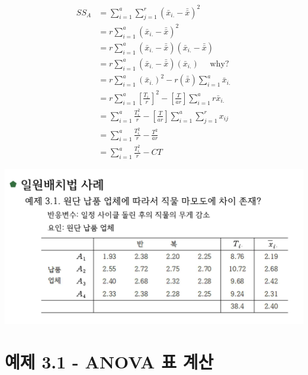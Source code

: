 \documentclass[
]{book}
\begin{document}
\begin{align*}
SS_A & = \sum_{i=1}^a \sum_{j=1}^r (\bar {x}_{i.} - \bar{\bar {x}} )^2 \\
   & = r \sum_{i=1}^a (\bar {x}_{i.} - \bar{\bar {x}} )^2 \\
   & = r \sum_{i=1}^a (\bar {x}_{i.} - \bar{\bar {x}} ) (\bar {x}_{i.} - \bar{\bar {x}} )  \\
   & = r \sum_{i=1}^a (\bar {x}_{i.} - \bar{\bar {x}} ) (\bar {x}_{i.} )  \quad \text{ why? } \\
  & = r \sum_{i=1}^a  (\bar {x}_{i.})^2 -  r (\bar{\bar {x}} )  \sum_{i=1}^a   \bar {x}_{i.}   \\
  & = r \sum_{i=1}^a  \left [  \frac{T_{i.}}{r} \right ]^2 -   \left [ \frac{T}{ar} \right ]   \sum_{i=1}^a   r \bar {x}_{i.}    \\   
 & =  \sum_{i=1}^a  \frac{T^2_{i.}}{r}  -  \left [ \frac{T}{ar} \right ] \sum_{i=1}^a   \sum_{j=1}^r x_{ij}   \\  
 & =  \sum_{i=1}^a  \frac{T^2_{i.}}{r}  -  \frac{T^2}{ar}  \\
  & =  \sum_{i=1}^a  \frac{T^2_{i.}}{r}  -  CT
\end{align*}

\includegraphics{oneway-hand-1.png}

\hypertarget{uxc608uxc81c-3.1---anova-uxd45c-uxacc4uxc0b0}{%
\section{예제 3.1 - ANOVA 표 계산}\label{uxc608uxc81c-3.1---anova-uxd45c-uxacc4uxc0b0}}
\end{document}
